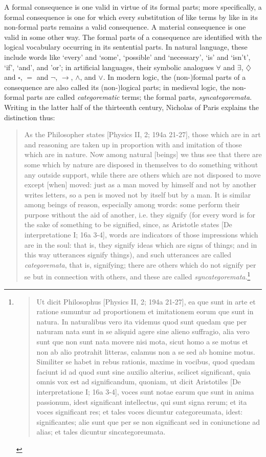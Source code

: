 \documentclass[]{article}
\begin{document}
A formal consequence is one valid in virtue of its formal parts; more specifically, a formal consequence is one for which every substitution of like terms by like in its non-formal parts remains a valid consequence. A material consequence is one valid in some other way. The formal parts of a consequence are identified with the logical vocabulary occurring in its sentential parts. In natural language, these include words like `every' and `some', `possible' and `necessary', `is' and `isn't', `if', `and', and 'or'; in artificial languages, their symbolic analogues $\forall$ and $\exists$, $\diamondsuit$ and $\square$, $=$ and $\neg$, $\rightarrow$, $\wedge$, and $\vee$. In modern logic, the (non-)formal parts of a consequence are also called its (non-)logical parts; in medieval logic, the non-formal parts are called \textit{categorematic} terms; the formal parts, \textit{syncategoremata}. Writing in the latter half of the thirteenth century, Nicholas of Paris explains the distinction thus:
\begin{quote}
	As the Philosopher states [Physics II, 2; 194a 21-27], those which are in art and reasoning are taken up in proportion with and imitation of those which are in nature. Now among natural [beings] we thus see that there are some which by nature are disposed in themselves to do something without any outside support, while there are others which are not disposed to move except [when] moved: just as a man moved by himself and not by another writes letters, so a pen is moved not by itself but by a man. It is similar among beings of reason, especially among words: some perform their purpose without the aid of another, i.e. they signify (for every word is for the sake of something to be signified, since, as Aristotle states [De interpretatione I; 16a 3-4], words are indicators of those impressions which are in the soul: that is, they signify ideas which are signs of things; and in this way utterances signify things), and such utterances are called \textit{categoremata}, that is, signifying; there are others which do not signify per se but in connection with others, and these are called \textit{syncategoremata}.\footnote{\autocite[I. 2-15]{Braakhuis1979} \begin{quote}
			Ut dicit Philosophus [Physics II, 2; 194a 21-27], ea que sunt in arte et ratione sumuntur ad proportionem et imitationem eorum que sunt in natura. In naturalibus vero ita videmus quod sunt quedam que per naturam nata sunt in se aliquid agere sine alieno suffragio, alia vero sunt que non sunt nata movere nisi mota, sicut homo a se motus et non ab alio protrahit litteras, calamus non a se sed ab homine motus. Similiter se habet in rebus rationis, maxime in vocibus, quod quedam faciunt id ad quod sunt sine auxilio alterius, scilicet significant, quia omnis vox est ad significandum, quoniam, ut dicit Aristotiles [De interpretatione I; 16a 3-4], voces sunt notae earum que sunt in anima passionum, idest significant intellectus, qui sunt signa rerum; et ita voces significant res; et tales voces dicuntur categoreumata, idest: significantes; alie sunt que per se non significant sed in coniunctione ad alias; et tales dicuntur sincategoreumata.
		\end{quote}}
\end{quote}
\end{document}
